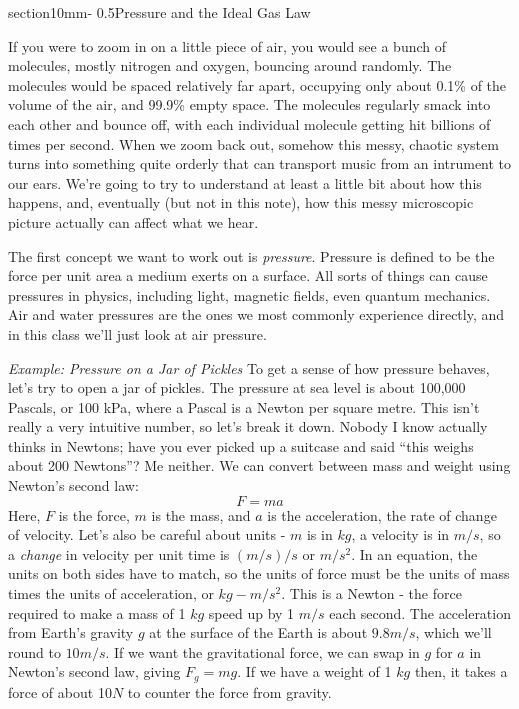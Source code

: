 \documentclass[letterpaper,11pt,preprint]{aastex}
\makeatletter
\renewcommand{\section}{\@startsection%
{section}{1}{0mm}{-\baselineskip}%
{0.5\baselineskip}{\normalfont\Large\bfseries}}%
\makeatother
\begin{document}
\pagestyle{plain}

\section{Pressure and the Ideal Gas Law}

If you were to zoom in on a little piece of air, you would see a bunch
of molecules, mostly nitrogen and oxygen, bouncing around randomly.
The molecules would be spaced relatively far apart, occupying only about
0.1\% of the volume of the air, and 99.9\% empty space.  The molecules
regularly smack into each other and bounce off, with each individual
molecule getting hit billions of times per second.  When we zoom back
out, somehow this messy, chaotic system turns into something quite
orderly that can transport music from an intrument to our ears.  We're
going to try to understand at least a little bit about how this
happens, and, eventually (but not in this note), how this messy
microscopic picture actually can affect what we hear.

The first concept we want to work out is \textit{pressure}.  Pressure
is defined to be the force per unit area a medium exerts on a
surface.  All sorts of things can cause pressures in physics,
including light, magnetic fields, even quantum mechanics.  Air and
water pressures are the ones we most commonly experience directly, and
in this class we'll just look at air pressure.

\textit{Example: Pressure on a Jar of Pickles}\newline
To get a sense of how pressure behaves, let's try to open a jar of
pickles.  The pressure at sea level is about 100,000 Pascals, or 100
kPa, where a Pascal is a Newton per square metre.  This isn't really a
very intuitive number, so let's break it down.  Nobody I know actually
thinks in Newtons; have you ever picked up a suitcase and said
``this weighs about 200 Newtons''?  Me neither.  We can convert
between mass and weight using Newton's second law:
\begin{equation}
  F=ma
\end{equation}
Here, $F$ is the force, $m$ is the mass, and $a$ is the acceleration,
the rate of change of velocity.  Let's also be careful about units -
$m$ is in $kg$, a velocity is in $m/s$, so a \textit{change} in
velocity per unit time is $(m/s)/s$ or $m/s^2$.  In an equation, the
units on both sides have to match, so the units of force must be the
units of mass times the units of acceleration, or $kg-m/s^2$.  This is
a Newton - the force required to make a mass of 1 $kg$ speed up by 1
$m/s$ each second.  The acceleration from Earth's gravity $g$ at the
surface of the Earth is about $9.8 m/s$, which we'll round to $10 m/s$.
If we want the gravitational force, we can swap in $g$ for $a$ in
Newton's second law, giving $F_g=mg$.  If we have a weight of 1 $kg$
then, it takes a force of about 10$N$ to counter the force from
gravity.
\end{document}
